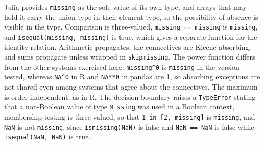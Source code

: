 \documentclass[11pt]{article}
\theoremstyle{remark}
\begin{document}
Julia provides \verb|missing| as the sole value of its own type, and arrays that may hold it carry the union type in their element type, so the possibility of absence is visible in the type. Comparison is three-valued, \verb|missing == missing| is \verb|missing|, and \verb|isequal(missing, missing)| is true, which gives a separate function for the identity relation. Arithmetic propagates, the connectives are Kleene absorbing, and sums propagate unless wrapped in \verb|skipmissing|. The power function differs from the other systems exercised here: \verb|missing^0| is \verb|missing| in the version tested, whereas \verb|NA^0| in R and \verb|NA**0| in pandas are 1, so absorbing exceptions are not shared even among systems that agree about the connectives. The maximum is order independent, as in R. The decision boundary raises a \verb|TypeError| stating that a non-Boolean value of type \verb|Missing| was used in a Boolean context, membership testing is three-valued, so that \verb|1 in [2, missing]| is \verb|missing|, and \verb|NaN| is not \verb|missing|, since \verb|ismissing(NaN)| is false and \verb|NaN == NaN| is false while \verb|isequal(NaN, NaN)| is true.
\end{document}
